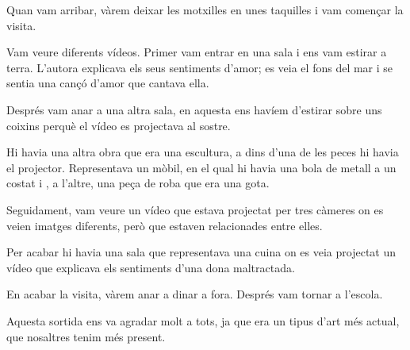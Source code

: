 
Quan vam arribar, vàrem deixar les motxilles en unes  taquilles i vam començar la visita.

Vam veure diferents vídeos. Primer vam entrar en una sala i ens vam estirar a terra. L'autora explicava els seus sentiments d'amor; es veia el fons del mar i se sentia una cançó d'amor  que cantava ella.

Després vam anar a una altra sala, en aquesta ens havíem d'estirar sobre uns coixins  perquè el vídeo es projectava al sostre.

Hi havia una altra obra que era una escultura, a dins d'una de les peces hi havia el projector. Representava un mòbil, en el qual hi havia una bola de metall a un costat i , a l'altre,  una peça de roba que era una gota.

Seguidament, vam veure un vídeo que estava projectat per tres càmeres on es veien imatges diferents, però que estaven relacionades entre elles.

Per acabar hi havia una sala que representava una cuina on es veia projectat un vídeo que explicava els sentiments d'una dona maltractada.

En acabar la visita, vàrem anar a dinar a fora. Després vam tornar a l'escola.

Aquesta sortida ens va agradar molt a tots, ja que era un tipus d'art més actual, que nosaltres tenim més present.

